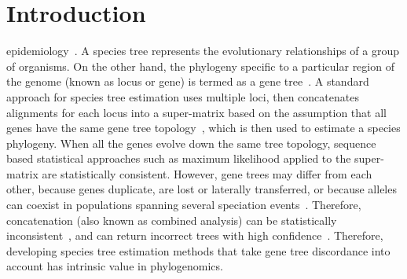 \section{Introduction}
\label{sec:intro}
 epidemiology~\cite{felix2015phylogenetics}. 
A species tree represents the evolutionary relationships of a group of organisms. On the other hand, the phylogeny specific to a particular region of the genome (known as locus or gene) is termed as a gene tree~\cite{maddison1997gene}. A standard approach for species tree estimation uses multiple loci, then concatenates alignments for each locus
into a super-matrix based on the assumption that all genes have the same gene tree topology~\cite{huelsenbeck1996combining, de2007supermatrix}, which is then used to estimate a species phylogeny. When all the genes evolve down the same tree topology,  sequence based statistical approaches such as maximum likelihood applied to the super-matrix are statistically consistent. 
However, gene trees may differ from each other, because genes duplicate, are lost or laterally transferred, or because alleles can coexist in populations spanning several speciation events~\cite{maddison1997gene}.
Therefore, concatenation (also known as combined analysis) can be statistically inconsistent~\cite{roch2015likelihood}, and can return incorrect trees with high confidence~\cite{kubatko-degnan-2007,edwards2007,leache-rannala,degiorgio2009}. Therefore, developing species tree estimation methods that take gene tree discordance into account has intrinsic value in phylogenomics.



